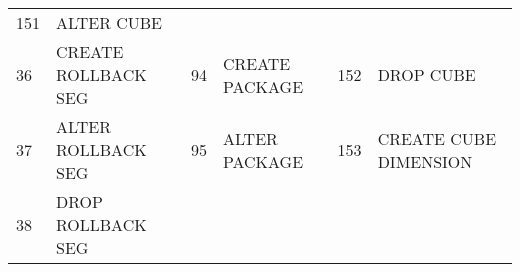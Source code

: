 \begin{longtable}[]{@{}llllll@{}}
\begin{minipage}[t]{0.06\columnwidth}
151\strut
\end{minipage} & \begin{minipage}[t]{0.24\columnwidth}\raggedright\strut
ALTER CUBE\strut
\end{minipage}\tabularnewline
\begin{minipage}[t]{0.06\columnwidth}\raggedright\strut
36\strut
\end{minipage} & \begin{minipage}[t]{0.19\columnwidth}\raggedright\strut
CREATE ROLLBACK SEG\strut
\end{minipage} & \begin{minipage}[t]{0.06\columnwidth}\raggedright\strut
94\strut
\end{minipage} & \begin{minipage}[t]{0.24\columnwidth}\raggedright\strut
CREATE PACKAGE\strut
\end{minipage} & \begin{minipage}[t]{0.06\columnwidth}\raggedright\strut
152\strut
\end{minipage} & \begin{minipage}[t]{0.24\columnwidth}\raggedright\strut
DROP CUBE\strut
\end{minipage}\tabularnewline
\begin{minipage}[t]{0.06\columnwidth}\raggedright\strut
37\strut
\end{minipage} & \begin{minipage}[t]{0.19\columnwidth}\raggedright\strut
ALTER ROLLBACK SEG\strut
\end{minipage} & \begin{minipage}[t]{0.06\columnwidth}\raggedright\strut
95\strut
\end{minipage} & \begin{minipage}[t]{0.24\columnwidth}\raggedright\strut
ALTER PACKAGE\strut
\end{minipage} & \begin{minipage}[t]{0.06\columnwidth}\raggedright\strut
153\strut
\end{minipage} & \begin{minipage}[t]{0.24\columnwidth}\raggedright\strut
CREATE CUBE DIMENSION\strut
\end{minipage}\tabularnewline
\begin{minipage}[t]{0.06\columnwidth}\raggedright\strut
38\strut
\end{minipage} & \begin{minipage}[t]{0.19\columnwidth}\raggedright\strut
DROP ROLLBACK SEG\strut
\end{minipage} & \begin{minipage}[t]{0.06\columnwidth}\raggedright\strut

\end{minipage}
\end{longtable}
